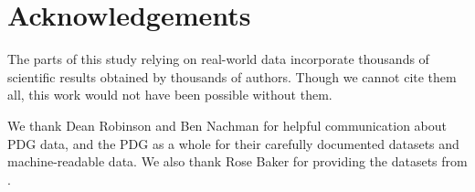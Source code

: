 \documentclass[letterpaper,12pt]{article}
\begin{document}
\section*{Acknowledgements}

The parts of this study relying on real-world data incorporate thousands of scientific results obtained by thousands of authors. Though we cannot cite them all, this work would not have been possible without them.

We thank Dean Robinson and Ben Nachman for helpful communication about PDG data, and the PDG as a whole for their carefully documented datasets and machine-readable data. We also thank Rose Baker for providing the datasets from \citet{baker2013meta}.

\twocolumn
\footnotesize

\normalsize
\end{document}
